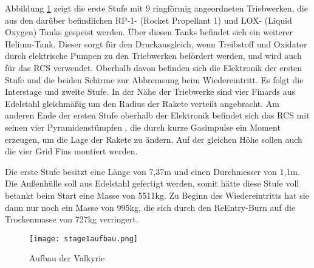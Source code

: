 Abbildung \ref{abb_1stage} zeigt die erste Stufe mit $9$ ringförmig angeordneten Triebwerken, die aus den darüber befindlichen RP-1- (Rocket Propellant 1) und LOX- (Liquid Oxygen) Tanks gespeist werden. Über diesen Tanks befindet sich ein weiterer Helium-Tank. Dieser sorgt für den Druckausgleich, wenn Treibstoff und Oxidator durch elektrische Pumpen zu den Triebwerken befördert werden, und wird auch für das RCS verwendet. Oberhalb davon befinden sich die Elektronik der ersten Stufe und die beiden Schirme zur Abbremsung beim Wiedereintritt. Es folgt die Interstage und zweite Stufe.
In der Nähe der Triebwerke sind vier Finards aus Edelstahl gleichmäßig um den Radius der Rakete verteilt angebracht. Am anderen Ende der ersten Stufe oberhalb der Elektronik befindet sich das RCS mit seinen vier Pyramidenstümpfen \cite{flugbahnBarz}, die durch kurze Gasimpulse ein Moment erzeugen, um die Lage der Rakete zu ändern. Auf der gleichen Höhe sollen auch die vier Grid Fins montiert werden.

Die erste Stufe besitzt eine Länge von 7,37m und einen Durchmesser von 1,1m. Die Außenhülle soll aus Edelstahl gefertigt werden, somit hätte diese Stufe voll betankt beim Start eine Masse von 5511kg. Zu Beginn des Wiedereintritts hat sie dann nur noch ein Masse von 995kg, die sich durch den ReEntry-Burn auf die Trockenmasse von 727kg verringert.
\begin{figure}[h]
	\centering
	\texttt{[image: stage1aufbau.png]}
	\begin{flushright}
	\end{flushright}
	\caption{Aufbau der Valkyrie}
	\label{abb_1stage}
\end{figure}
